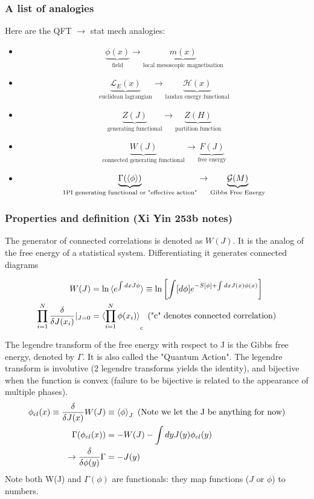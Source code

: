 \documentclass[11pt]{scrartcl}
\begin{document}
\subsubsection{A list of analogies}
Here are the QFT $\rightarrow$ stat mech analogies:
\begin{itemize}
	\item \[ \underbrace{\phi(x)}_{\text{field}} \rightarrow \underbrace{m(x)}_{\text{local mesoscopic magnetisation}} \]
	\item \[ \underbrace{\mathcal{L}_{E} (x)}_{\text{euclidean lagrangian}} \rightarrow \underbrace{\mathcal{H}(x)}_{\text{landau energy functional}} \] 
	\item \[ \underbrace{Z(J)}_{\text{generating functional}} \rightarrow \underbrace{Z(H)}_{\text{partition function}} \]
	\item \[ \underbrace{W(J)}_{\text{connected generating functional}} \rightarrow \underbrace{F(J)}_{\text{free energy}} \]
	\item \[ \underbrace{\Gamma(\braket{\phi})}_{\text{1PI generating functional or "effective action"}} \rightarrow \underbrace{\mathcal{G}(M)}_{\text{Gibbs Free Energy}} \]
	\end{itemize}

\subsubsection{Properties and definition (Xi Yin 253b notes)}

The generator of connected correlations is denoted as $W(J)$.  It is the analog of the free energy of a statistical system. Differentiating it generates connected diagrams

\begin{align}
W(J) &= \ln \braket{ e^{\int dx J \phi}} \equiv \ln \left[ \int [d \phi] e^{- S[\phi] + \int dx J(x) \phi(x) } \right]  \\
\prod_{i = 1}^N {\delta \over \delta J(x_i)}|_{J = 0} & = \braket{\prod_{i = 1}^N \phi(x_i)}_{c} \text{ ("c" denotes connected correlation)}
\end{align}

The legendre transform of the free energy with respect to J is the Gibbs free energy, denoted by $\Gamma$.  It is also called the "Quantum Action". The legendre transform is involutive (2 legendre transforms yields the identity), and bijective
when the function is convex (failure to be bijective is related to the appearance of multiple phases).
\begin{align}
 \phi_{cl}(x) \equiv {\delta \over \delta J(x)} W(J) & \equiv \braket{\phi}_{J} \text{ (Note we let the J be anything for now)} \\
   \Gamma(\phi_{cl} (x))  & = -W(J) - \int dy J(y) \phi_{cl} (y) \\
   \rightarrow {\delta \over \delta \phi(y)} \Gamma  & = -J (y)
\end{align}
Note both W(J) and $\Gamma(\phi)$ are functionals: they map functions ($J$ or $\phi$) to numbers. 
\end{document}
